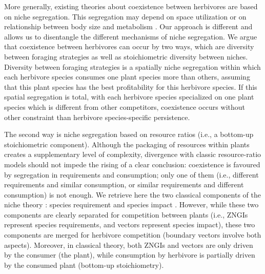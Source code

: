 \documentclass[12pt]{article}
\begin{document}
More generally, existing theories about coexistence between herbivores are based on niche segregation. This segregation may depend on space utilization or on relationship between body size and metabolism \citep{Owen-Smith1982}. Our approach is different and allows us to disentangle the different mechanisms of niche segregation. We argue that coexistence between herbivores can occur by two ways, which are  diversity between foraging strategies as well as stoichiometric diversity between niches. Diversity between foraging strategies is a spatially niche segregation within which each herbivore species consumes one plant species more than others, assuming that this plant species has the best profitability for this herbivore species. If this spatial segregation is total, with each herbivore species specialized on one plant species which is different from other competitors, coexistence occurs without other constraint than herbivore species-specific persistence. 
\par
The second way is niche segregation based on resource ratios (i.e., a bottom-up stoichiometric component). Although the packaging of resources within plants creates a supplementary level of complexity, divergence with classic resource-ratio models should not impede the rising of a clear conclusion: coexistence is favoured by segregation in requirements and consumption; only one of them (i.e., different requirements and similar consumption, or similar requirements and different consumption) is not enough. We retrieve here the two classical components of the niche theory \citep{Chase2003}: species requirement \citep{Hutchinson1957} and species impact \citep{Elton1927, Macarthur1967}. However, while these two components are clearly separated for competition between plants (i.e., ZNGIs represent species requirements, and vectors represent species impact), these two components are merged for herbivore competition (boundary vectors involve both aspects). Moreover, in classical theory, both ZNGIs and vectors are only driven by the consumer (the plant), while consumption by herbivore is partially driven by the consumed plant (bottom-up stoichiometry). 
\par 
\end{document}
